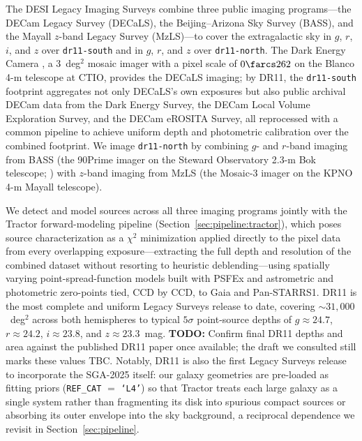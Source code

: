 \documentclass[modern,linenumbers]{aastex701}
\newcommand{\todo}[1]{{\color{red}\textbf{TODO:} #1}}
\begin{document}
The DESI Legacy Imaging Surveys \citep{dey19a} combine three public
imaging programs---the DECam Legacy Survey (DECaLS), the
Beijing--Arizona Sky Survey (BASS), and the Mayall $z$-band Legacy
Survey (MzLS)---to cover the extragalactic sky in $g$, $r$, $i$, and
$z$ over \texttt{dr11-south} and in $g$, $r$, and $z$ over
\texttt{dr11-north}. The Dark Energy Camera \citep[DECam;][]{flaugher15a},
a 3~deg$^2$ mosaic imager with a pixel scale of $0\farcs262$ on the
Blanco 4-m telescope at CTIO, provides the DECaLS imaging; by DR11, the
\texttt{dr11-south} footprint aggregates not only DECaLS's own exposures
but also public archival DECam data from the Dark Energy Survey, the
DECam Local Volume Exploration Survey, and the DECam eROSITA Survey, all
reprocessed with a common pipeline to achieve uniform depth and
photometric calibration over the combined footprint. We image
\texttt{dr11-north} by combining $g$- and $r$-band imaging from BASS
(the 90Prime imager on the Steward Observatory 2.3-m Bok telescope;
\citealt{zou17a}) with $z$-band imaging from MzLS (the Mosaic-3 imager
on the KPNO 4-m Mayall telescope).

We detect and model sources across all three imaging programs jointly
with the Tractor forward-modeling pipeline (Section~\ref{sec:pipeline:tractor}),
which poses source characterization as a $\chi^2$ minimization applied
directly to the pixel data from every overlapping exposure---extracting
the full depth and resolution of the combined dataset without resorting
to heuristic deblending---using spatially varying point-spread-function
models built with PSFEx and astrometric and photometric zero-points tied,
CCD by CCD, to Gaia and Pan-STARRS1. DR11 is the most complete and
uniform Legacy Surveys release to date, covering $\sim\!31{,}000$~deg$^2$
across both hemispheres to typical $5\sigma$ point-source depths of
$g\approx24.7$, $r\approx24.2$, $i\approx23.8$, and $z\approx23.3$~mag.
\todo{Confirm final DR11 depths and area against the published DR11
  paper once available; the draft we consulted still marks these
  values TBC.}  Notably, DR11 is also the first Legacy Surveys release
to incorporate the SGA-2025 itself: our galaxy geometries are pre-loaded
as fitting priors (\texttt{REF\_CAT} $=$ \texttt{`L4'}) so that Tractor
treats each large galaxy as a single system rather than fragmenting its
disk into spurious compact sources or absorbing its outer envelope into
the sky background, a reciprocal dependence we revisit in
Section~\ref{sec:pipeline}.

\end{document}
